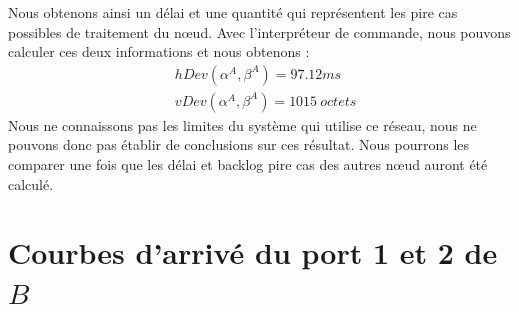 Nous obtenons ainsi un délai et une quantité qui représentent les pire cas possibles de traitement du nœud. Avec l'interpréteur de commande, nous pouvons calculer ces deux informations et nous obtenons : \begin{align}\label{eqn:delai-backlog}
&hDev(\alpha^A,\beta^A) = 97.12 ms\\
&vDev(\alpha^A,\beta^A) = 1015\ octets
\end{align}
Nous ne connaissons pas les limites du système qui utilise ce réseau, nous ne pouvons donc pas établir de conclusions sur ces résultat. Nous pourrons les comparer une fois que les délai et backlog pire cas des autres nœud auront été calculé.

\section{Courbes d'arrivé du port 1 et 2 de $B$} 
